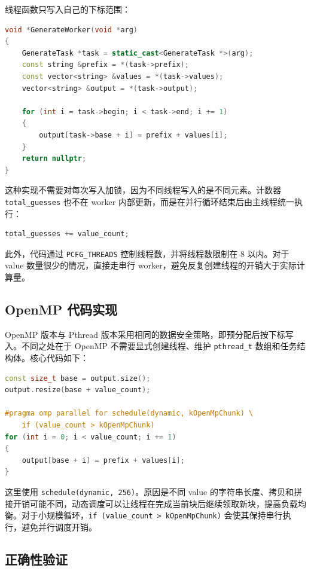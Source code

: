 \documentclass[UTF8,a4paper,12pt]{ctexart}
\begin{document}
线程函数只写入自己的下标范围：

\begin{lstlisting}[language=C++]
void *GenerateWorker(void *arg)
{
    GenerateTask *task = static_cast<GenerateTask *>(arg);
    const string &prefix = *(task->prefix);
    const vector<string> &values = *(task->values);
    vector<string> &output = *(task->output);

    for (int i = task->begin; i < task->end; i += 1)
    {
        output[task->base + i] = prefix + values[i];
    }
    return nullptr;
}
\end{lstlisting}

这种实现不需要对每次写入加锁，因为不同线程写入的是不同元素。计数器 \texttt{total\_guesses} 也不在 worker 内部更新，而是在并行循环结束后由主线程统一执行：

\begin{lstlisting}[language=C++]
total_guesses += value_count;
\end{lstlisting}

此外，代码通过 \texttt{PCFG\_THREADS} 控制线程数，并将线程数限制在 8 以内。对于 value 数量很少的情况，直接走串行 worker，避免反复创建线程的开销大于实际计算量。

\subsection{OpenMP 代码实现}

OpenMP 版本与 Pthread 版本采用相同的数据安全策略，即预分配后按下标写入。不同之处在于 OpenMP 不需要显式创建线程、维护 \texttt{pthread\_t} 数组和任务结构体。核心代码如下：

\begin{lstlisting}[language=C++]
const size_t base = output.size();
output.resize(base + value_count);

#pragma omp parallel for schedule(dynamic, kOpenMpChunk) \
    if (value_count > kOpenMpChunk)
for (int i = 0; i < value_count; i += 1)
{
    output[base + i] = prefix + values[i];
}
\end{lstlisting}

这里使用 \texttt{schedule(dynamic, 256)}。原因是不同 value 的字符串长度、拷贝和拼接开销可能不同，动态调度可以让线程在完成当前块后继续领取新块，提高负载均衡。对于小规模循环，\texttt{if (value\_count > kOpenMpChunk)} 会使其保持串行执行，避免并行调度开销。

\subsection{正确性验证}
\end{document}
